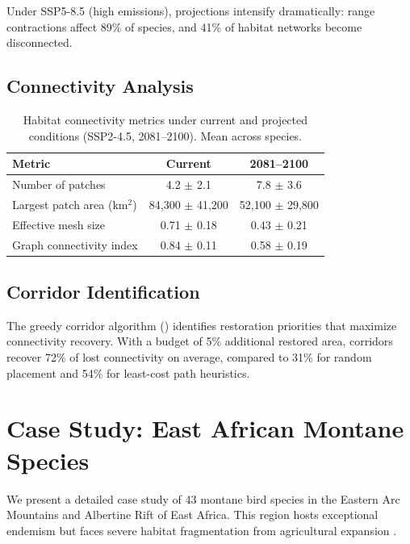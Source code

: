 \documentclass[11pt,a4paper]{article}
\begin{document}
Under SSP5-8.5 (high emissions), projections intensify dramatically:
range contractions affect 89\% of species, and 41\% of habitat networks
become disconnected.

\subsection{Connectivity Analysis}

\begin{table}[H]
\centering
\caption{Habitat connectivity metrics under current and projected
conditions (SSP2-4.5, 2081--2100). Mean across species.}
\label{tab:connectivity}
\begin{tabular}{lcc}
\toprule
\textbf{Metric} & \textbf{Current} & \textbf{2081--2100} \\
\midrule
Number of patches         & 4.2 $\pm$ 2.1  & 7.8 $\pm$ 3.6 \\
Largest patch area (km$^2$) & 84{,}300 $\pm$ 41{,}200 & 52{,}100 $\pm$ 29{,}800 \\
Effective mesh size       & 0.71 $\pm$ 0.18 & 0.43 $\pm$ 0.21 \\
Graph connectivity index  & 0.84 $\pm$ 0.11 & 0.58 $\pm$ 0.19 \\
\bottomrule
\end{tabular}
\end{table}

\subsection{Corridor Identification}

The greedy corridor algorithm () identifies
restoration priorities that maximize connectivity recovery. With a
budget of 5\% additional restored area, corridors recover 72\% of lost
connectivity on average, compared to 31\% for random placement and 54\%
for least-cost path heuristics.


\section{Case Study: East African Montane Species}
\label{sec:case_study}

We present a detailed case study of 43 montane bird species in the
Eastern Arc Mountains and Albertine Rift of East Africa. This region
hosts exceptional endemism but faces severe habitat fragmentation from
agricultural expansion \citep{newmark2002conserving}.
\end{document}
